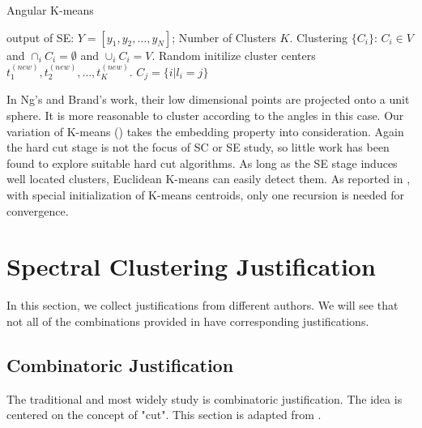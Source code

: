 \begin{algorithm}[htb]
	\caption{Angular K-means}
	\label{alg:sc_akm}
	\begin{algorithmic}[1]
		\REQUIRE output of SE: $Y = [y_1, y_2, \ldots, y_N]$;  
		Number of Clusters $K$. 
		\ENSURE Clustering $\{C_i\}$: $C_i \in V$ 
			and $\cap_i C_i = \emptyset$
			and $\cup_i C_i = V$. 
		\STATE Random initilize cluster centers $t^{(new)}_1, t^{(new)}_2, \dots, t^{(new)}_K$.
		\STATE $C_j = \{i| l_i = j\}$
	\end{algorithmic}
\end{algorithm}

In Ng's \cite{ng2002spectral} and Brand's \cite{brand2003unifying} work, 
their low dimensional points are projected onto a unit sphere. It is more 
reasonable to cluster according to the angles
in this case. Our variation of K-means
(\ralg{\ref{alg:sc_akm}}) takes the embedding property into consideration. 
Again the hard cut stage is not the focus of SC or SE study, so 
little work has been found to explore suitable hard cut algorithms. 
As long as the SE stage induces well located clusters, Euclidean 
K-means can easily detect them. As reported in \cite{ng2002spectral}, 
with special initialization of K-means centroids, only one recursion 
is needed for convergence. 

\section{Spectral Clustering Justification}
\label{sec:justification}

In this section, we collect justifications from different authors. 
We will see that not all of the combinations provided in 
\rsec{\ref{sec:framework}} have corresponding justifications. 

\subsection{Combinatoric Justification}

The traditional and most widely study is combinatoric justification. 
The idea is centered on the concept of "cut". This section is 
adapted from 
\cite{shi2000normalized}
\cite{von2007tutorial}
\cite{dhillon2004unified}. 


